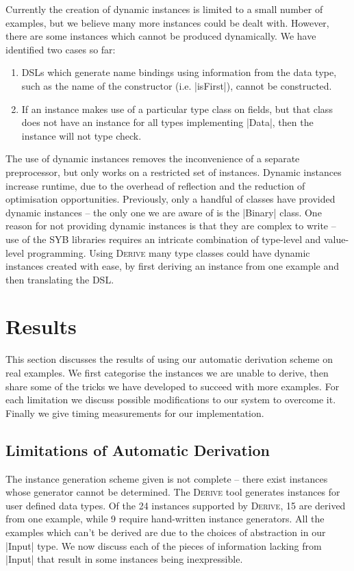 \documentclass{llncs}
\newcommand{\derive}{\textsc{Derive}}
\begin{document}
Currently the creation of dynamic instances is limited to a small number of examples, but we believe many more instances could be dealt with. However, there are some instances which cannot be produced dynamically. We have identified two cases so far:

\begin{enumerate}
\item DSLs which generate name bindings using information from the data type, such as the name of the constructor (i.e. |isFirst|), cannot be constructed.
\item If an instance makes use of a particular type class on fields, but that class does not have an instance for all types implementing |Data|, then the instance will not type check.
\end{enumerate}

The use of dynamic instances removes the inconvenience of a separate preprocessor, but only works on a restricted set of instances. Dynamic instances increase runtime, due to the overhead of reflection and the reduction of optimisation opportunities. Previously, only a handful of classes have provided dynamic instances -- the only one we are aware of is the |Binary| class. One reason for not providing dynamic instances is that they are complex to write -- use of the SYB libraries requires an intricate combination of type-level and value-level programming. Using \derive{} many type classes could have dynamic instances created with ease, by first deriving an instance from one example and then translating the DSL.

\section{Results}
\label{sec:results}

This section discusses the results of using our automatic derivation scheme on real examples. We first categorise the instances we are unable to derive, then share some of the tricks we have developed to succeed with more examples. For each limitation we discuss possible modifications to our system to overcome it. Finally we give timing measurements for our implementation.

\subsection{Limitations of Automatic Derivation}
\label{sec:failure}

The instance generation scheme given is not complete -- there exist instances whose generator cannot be determined. The \derive{} tool \cite{derive} generates instances for user defined data types. Of the 24 instances supported by \derive{}, 15 are derived from one example, while 9 require hand-written instance generators. All the examples which can't be derived are due to the choices of abstraction in our |Input| type. We now discuss each of the pieces of information lacking from |Input| that result in some instances being inexpressible.
\end{document}
